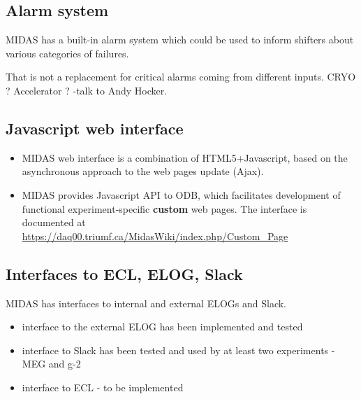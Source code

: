 

\subsection{Alarm system}

MIDAS has a built-in alarm system which could be used to inform shifters
about various categories of failures.

That is not a replacement for critical alarms coming from different inputs.
CRYO ? Accelerator ? -{\red talk to Andy Hocker.}


\subsection{Javascript web interface}

\begin{itemize}
\item 
  MIDAS web interface is a combination of HTML5+Javascript, based on the
  asynchronous approach to the web pages update (Ajax).
\item 
  MIDAS provides Javascript API to ODB, which facilitates development of
  functional experiment-specific {\bf custom} web pages.
  The interface is documented at \\
  \href{https://daq00.triumf.ca/MidasWiki/index.php/Custom\_Page}
  {\blue https://daq00.triumf.ca/MidasWiki/index.php/Custom\_Page}
\end{itemize}


\subsection{Interfaces to ECL, ELOG, Slack}

MIDAS has interfaces to internal and external ELOGs and Slack.
\begin{itemize}
\item
  interface to the external ELOG has been implemented and tested
\item
  interface to Slack has been tested and used by at least two experiments - MEG and g-2
\item
  interface to ECL - to be implemented
\end{itemize}


